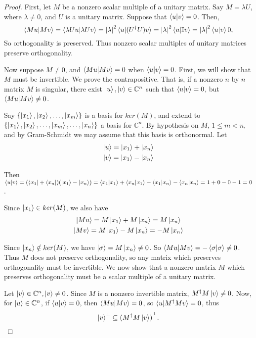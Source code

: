 \begin{proof}
First, let $M$ be a nonzero scalar multiple of a unitary matrix. Say $M=\lambda U$, where $\lambda \ne 0$, and $U$ is a unitary matrix.  Suppose that $\braket{u|v}=0$.  Then,
$$\braket{Mu|Mv}=\braket{\lambda Uu|\lambda Uv}={|\lambda|}^2 \braket{u|(U^\dagger U)v}={|\lambda|}^2 \braket{u|\mathbb{I}v}={|\lambda|}^2 \braket{u|v}0,$$ So orthogonality is preserved.  Thus nonzero scalar multiples of unitary matrices preserve orthogonality.

Now suppose $M\neq0$, and $\braket{Mu|Mv}=0$ when $\braket{u|v}=0$. First, we will show that $M$ must be invertible.  We prove the contrapositive.  That is, if a nonzero $n$ by $n$ matrix $M$ is singular, there exist $\ket{u}, \ket{v} \in \mathbb{C}^n$ such that $\braket{u|v}=0$, but $\braket{Mu|Mv} \ne 0$.

Say $\{\ket{x_1}, \ket{x_2},\hdots, \ket{x_m}\}$ is a basis for $ker(M)$, and extend to $\{\ket{x_1}, \ket{x_2},\hdots, \ket{x_m}, \hdots, \ket{x_n}\}$ a basis for ${\mathbb{C}}^n$.  By hypothesis on $M$, $1 \leq m <n$, and by Gram-Schmidt we may assume that this basis is orthonormal.  Let
\begin{gather*}
    \ket{u}=\ket{x_1}+\ket{x_n}\\
    \ket{v}=\ket{x_1}-\ket{x_n}
\end{gather*}

Then $\braket{u|v}=(\bra{x_1}+\bra{x_n})(\ket{x_1}-\ket{x_n})=\braket{x_1|x_1}+\braket{x_n|x_1}-\braket{x_1|x_n}-\braket{x_n|x_n}=1+0-0-1=0$.

Since $\ket{x_1} \in ker(M)$, we also have
\begin{gather*}
    \ket{Mu}=M\ket{x_1}+M\ket{x_n}=M\ket{x_n}\\
    \ket{Mv}=M\ket{x_1}-M\ket{x_n}=-M\ket{x_n}    
\end{gather*}

Since $\ket{x_n} \notin ker(M)$, we have $\ket{\sigma}=M\ket{x_n} \ne 0$. So $\braket{Mu|Mv}=-\braket{\sigma|\sigma} \ne 0$. Thus $M$ does not preserve orthogonality, so any matrix which preserves orthogonality must be invertible.  We now show that a nonzero matrix $M$ which preserves orthogonality must be a scalar multiple of a unitary matrix.

Let $\ket{v} \in \mathbb{C}^n, \ket{v} \ne 0$.  Since $M$ is a nonzero invertible matrix, $M^\dagger M \ket{v} \ne 0$.  Now, for $\ket{u} \in \mathbb{C}^n$, if $\braket{u|v}=0$, then $\braket{Mu|Mv}=0$, so $\braket{u|M^\dagger Mv}=0$, thus
$$\ket{v}^\perp \subseteq {(M^\dagger M\ket{v})}^\perp.$$


\end{proof}
